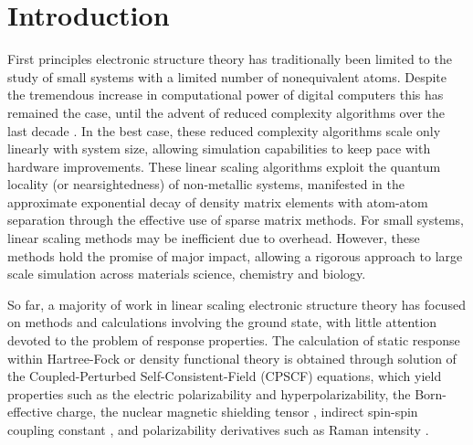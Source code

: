 \documentclass[prl,aps,letterpaper,twocolumn,showpacs,twocolumngrid,superbib]{revtex4}
\begin{document}
\section{Introduction}
First principles electronic structure theory has traditionally been limited 
to the study of small systems with a limited number of nonequivalent atoms. 
Despite the tremendous increase in computational power of digital computers this 
has remained the case, until the advent of reduced complexity algorithms over the
last decade \cite{GGalli96,DBowler97,SGoedecker99,POrdejon00,VGogonea01,SWu02}. In the 
best case, these reduced complexity algorithms scale only linearly with system size, 
allowing simulation capabilities to keep pace with hardware improvements.
These linear scaling algorithms exploit the quantum locality (or nearsightedness) of 
non-metallic systems,  manifested in the approximate exponential decay of density matrix elements 
with atom-atom separation through the effective use of sparse matrix methods. For small systems,
linear scaling methods may be inefficient due to overhead.  However, these methods hold the promise 
of major impact, allowing a rigorous approach to large scale simulation across materials science, 
chemistry and biology. 

So far, a majority of work in linear scaling electronic structure theory 
has focused on methods and calculations involving the ground state, with little 
attention devoted to the problem of response properties.  The calculation of static
response within  Hartree-Fock or density functional theory is obtained through solution 
of the Coupled-Perturbed Self-Consistent-Field (CPSCF) equations, which yield properties 
such as the electric polarizability and hyperpolarizability, the Born-effective charge, 
the nuclear magnetic shielding tensor \cite{Pulay_1990}, indirect spin-spin coupling
constant \cite{Pennington_1991,Malkin_1996}, and polarizability derivatives such as 
Raman intensity \cite{Lazzeri_2003,Champagne_2001}.


\newpage
\end{document}
